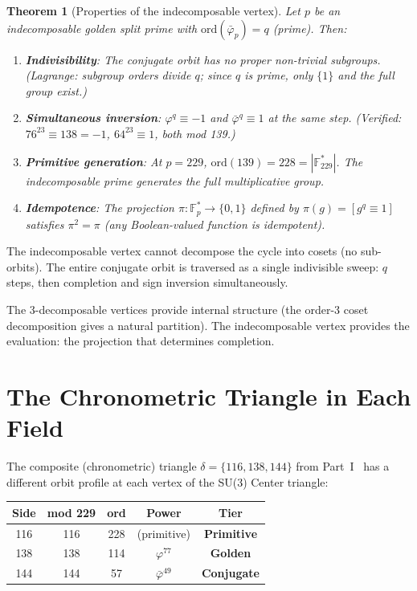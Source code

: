 \documentclass[12pt,oneside]{article}
\theoremstyle{principia}
\newtheorem{theorem}{Theorem}[section]
\theoremstyle{definition}
\theoremstyle{remark}
\begin{document}
\begin{theorem}[Properties of the indecomposable vertex]
\label{thm:projection}
Let $p$ be an indecomposable golden split prime with
$\mathrm{ord}(\bar\varphi_p) = q$ (prime). Then:
\begin{enumerate}
  \item \textbf{Indivisibility}: The conjugate orbit has no proper
    non-trivial subgroups. (Lagrange: subgroup orders divide $q$;
    since $q$ is prime, only $\{1\}$ and the full group exist.)
  \item \textbf{Simultaneous inversion}: $\varphi^q \equiv -1$ and
    $\bar\varphi^q \equiv 1$ at the same step.
    (Verified: $76^{23} \equiv 138 = -1$, $64^{23} \equiv 1$, both mod 139.)
  \item \textbf{Primitive generation}: At $p = 229$,
    $\mathrm{ord}(139) = 228 = |\mathbb{F}_{229}^*|$.
    The indecomposable prime generates the full multiplicative group.
  \item \textbf{Idempotence}: The projection
    $\pi: \mathbb{F}_p^* \to \{0, 1\}$ defined by
    $\pi(g) = [g^q \equiv 1]$ satisfies $\pi^2 = \pi$
    (any Boolean-valued function is idempotent).
\end{enumerate}
\end{theorem}

The indecomposable vertex cannot decompose the cycle into cosets
(no sub-orbits). The entire conjugate orbit is traversed as a single
indivisible sweep: $q$ steps, then completion and sign inversion
simultaneously.

The 3-decomposable vertices provide internal structure (the
order-3 coset decomposition gives a natural partition). The
indecomposable vertex provides the evaluation: the projection
that determines completion.

\section{The Chronometric Triangle in Each Field}
\label{sec:chrono}

The composite (chronometric) triangle $\delta = \{116, 138, 144\}$
from Part~I~\cite{dwm_fst} has a different orbit profile at each
vertex of the SU(3) Center triangle:

\begin{center}
\begin{tabular}{@{}ccccc@{}}
\toprule
Side & mod 229 & ord & Power & Tier \\
\midrule
116 & 116 & 228 & (primitive) & \textbf{Primitive} \\
138 & 138 & 114 & $\varphi^{77}$ & \textbf{Golden} \\
144 & 144 &  57 & $\bar\varphi^{49}$ & \textbf{Conjugate} \\
\bottomrule
\end{tabular}
\end{center}
\end{document}

